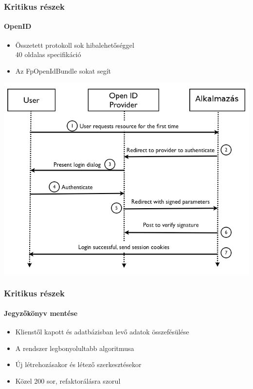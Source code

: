 \documentclass[12pt]{beamer}
\begin{document}
\begin{frame}
    \frametitle{Kritikus részek}
    \framesubtitle{OpenID}
    
    \begin{itemize}
        \item Összetett protokoll sok hibalehetőséggel\\
            \small{40 oldalas specifikáció}
        \item Az FpOpenIdBundle sokat segít
    \end{itemize}

    \begin{center}
    \includegraphics[height=0.5\textheight,center]{openid.png}
    \end{center}
\end{frame}

\begin{frame}
    \frametitle{Kritikus részek}
    \framesubtitle{Jegyzőkönyv mentése}

    \large    
    \begin{itemize}
        \item Klienstől kapott és adatbázisban levő adatok összefésülése
        \item A rendszer legbonyolultabb algoritmusa
        \item Új létrehozásakor és létező szerkesztésekor
        \item Közel 200 sor, refaktorálásra szorul
    \end{itemize}
\end{frame}
\end{document}
